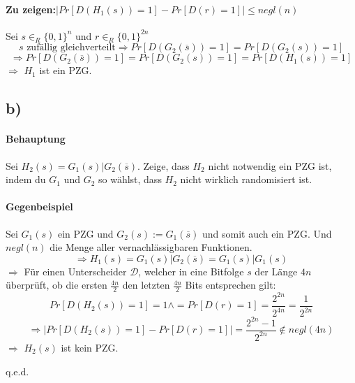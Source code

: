 \documentclass[a4paper,11pt,twoside]{scrartcl}
\begin{document}
\paragraph{Zu zeigen:$\left|Pr\left[D(H_1(s))= 1\right] - Pr\left[D(r) = 1\right]\right| \leq negl(n) $}
Sei $s\in_R\{ 0,1 \}^n$ und $r\in_R\{ 0,1 \}^{2n}$
\[ s\text{ zufällig gleichverteilt} \Rightarrow Pr\left[D(G_2(\overline s))=1\right] =Pr\left[D(G_2(s))= 1\right]\]
\[\Rightarrow Pr\left[D(G_2(\overline s))=1\right]=Pr\left[D(G_2(s))=1\right]=Pr\left[D(H_1(s))=1\right]\]
$\Rightarrow$ $H_1$ ist ein PZG.

\subsection*{b)}
\paragraph{Behauptung}
Sei $H_2(s) = G_1(s)|G_2(\overline s)$. Zeige, dass $H_2$ nicht notwendig ein PZG ist, indem du $G_1$ und $G_2$ so wählst, dass $H_2$ nicht wirklich randomisiert ist.
\paragraph{Gegenbeispiel}
Sei $G_1(s)$ ein PZG und $G_2(s) := G_1(\overline s)$ und somit auch ein PZG. Und $negl(n)$ die Menge aller vernachlässigbaren Funktionen.
\[ \Rightarrow H_1(s)=G_1(s)|G_2(\overline s) = G_1(s)|G_1(s) \]
$\Rightarrow$ Für einen Unterscheider $\mathcal D$, welcher in eine Bitfolge $s$ der Länge $4n$ überprüft, ob die ersten $\frac{4n}{2}$ den letzten $\frac{4n}{2}$ Bits entsprechen gilt:
\[ Pr\left[D(H_2(s))= 1\right] = 1 \land =Pr\left[D(r)= 1\right] = \frac{2^{2n}}{2^{4n}} = \frac{1}{2^{2n}} \]
\[\Rightarrow \left|Pr\left[D(H_2(s))= 1\right] - Pr\left[D(r) = 1\right]\right| = \frac{2^{2n}-1}{2^{2n}}\notin negl(4n)  \]
$\Rightarrow$ $H_2(s)$ ist kein PZG.
\begin{flushright}
	q.e.d.
\end{flushright}  
\end{document}
